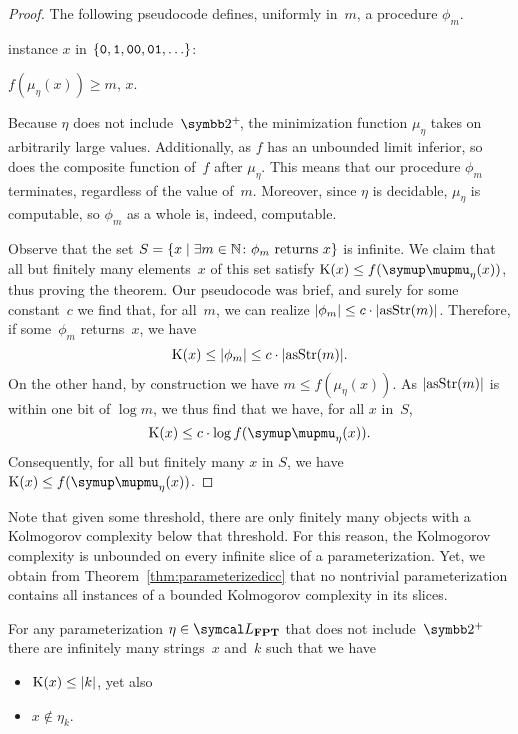 \begin{proof}
  The following pseudocode defines, uniformly in~$m$, a procedure $\phi_m$.
  \begin{codelisting}
  \item
     instance $x$ in $\{\bits{0}, \bits{1}, \bits{00}, \bits{01}, \ldots\}$:
    \begin{codelisting}
      \item {} $f(\mu_\eta(x)) \ge m$,  $x$.
    \end{codelisting}
  \end{codelisting}

  Because $\eta$ does not include~$\binary^+\!$, the minimization function $\mu_\eta$ takes on arbitrarily large values.
  Additionally, as $f$ has an unbounded limit inferior, so does the composite function of~$f$ after $\mu_\eta$.
  This means that our procedure $\phi_m$ terminates, regardless of the value of~$m$.
  Moreover, since $\eta$ is decidable, $\mu_\eta$ is computable, so $\phi_m$ as a whole is, indeed, computable.

  Observe that the set $S = \{x \;|\; \exists m \in \mathbb{N}\colon \text{$\phi_m$ returns $x$}\}$ is infinite.
  We claim that all but finitely many elements~$x$ of this set satisfy $\KC(x) \le f(\mu_\eta(x))$, thus proving the theorem.
  Our pseudocode was brief, and surely for some constant~$c$ we find that, for all~$m$, we can realize ${\lvert\phi_m\rvert} \le c \cdot {\lvert\operatorname{asStr}(m)\rvert}$.
  Therefore, if some~$\phi_m$ returns~$x$, we have
  \begin{equation*}
    \operatorname{K}(x) \le {\lvert\phi_m\rvert} \le c \cdot {\lvert\operatorname{asStr}(m)\rvert}.
  \end{equation*}
  On the other hand, by construction we have $m \le f(\mu_\eta(x))$.
  As ${\lvert\operatorname{asStr}(m)\rvert}$ is within one bit of $\log m$, we thus find that we have, for all $x$ in~$S$,
  \begin{equation*}
    \KC(x) \le c \cdot \log f(\mu_\eta(x)).
  \end{equation*}
  Consequently, for all but finitely many $x$ in $S$, we have $\KC(x) \le f(\mu_\eta(x))$.
\end{proof}

Note that given some threshold, there are only finitely many objects with a Kolmogorov complexity below that threshold.
For this reason, the Kolmogorov complexity is unbounded on every infinite slice of a parameterization.
Yet, we obtain from Theorem~\ref{thm:parameterizedicc} that no nontrivial parameterization contains all instances of a bounded Kolmogorov complexity in its slices.
\begin{corollary}
\label{cor:parameterizedicc}%
  For any parameterization $\eta \in \calL_\cl{FPT}$ that does not include~$\binary^+$ there are infinitely many strings~$x$ and~$k$ such that we have
  \begin{itemize}
  \item $\operatorname{K}(x) \le {\lvert k\rvert}$, yet also
  \item $x \notin \eta_k$.
  \end{itemize}
\end{corollary}

